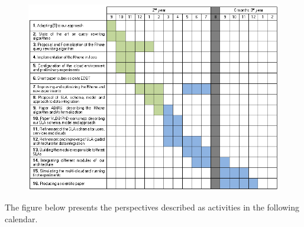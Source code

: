\documentclass[11pt,a4paper,oneside]{report}
\begin{document}

\begin{figure}[h!]
\center
\includegraphics[scale=0.7]{calendar.png}
\end{figure}

\noindent
The figure below presents the perspectives described as activities in the following calendar. 


 
\end{document}
